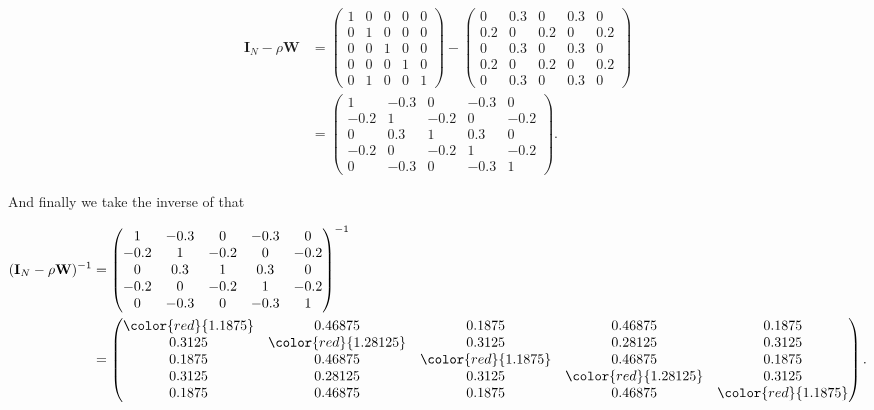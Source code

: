 \documentclass[
  letterpaper,
  DIV=11,
  numbers=noendperiod]{scrreprt}
\begin{document}
\[
\begin{split}
\boldsymbol{\mathbf{I}}_N - \rho \boldsymbol{\mathbf{W}} &=
\begin{pmatrix}
      1 & 0 & 0 & 0 & 0 \\
      0 & 1 & 0 & 0 & 0 \\
      0 & 0 & 1 & 0 & 0 \\
      0 & 0 & 0 & 1 & 0 \\
      0 & 1 & 0 & 0 & 1
      \end{pmatrix} - 
\begin{pmatrix}
      0 & 0.3 & 0 & 0.3 & 0 \\
      0.2 & 0 & 0.2 & 0 & 0.2 \\
      0 & 0.3 & 0 & 0.3 & 0 \\
      0.2 & 0 & 0.2 & 0 & 0.2 \\
      0 & 0.3 & 0 & 0.3 & 0
      \end{pmatrix}\\
& = \begin{pmatrix}
      1 & -0.3 & 0 & -0.3 & 0 \\
      -0.2 & 1 & -0.2 & 0 & -0.2 \\
      0 & 0.3 & 1 & 0.3 & 0 \\
      -0.2 & 0 & -0.2 & 1 & -0.2 \\
      0 & -0.3 & 0 & -0.3 & 1
      \end{pmatrix}.
\end{split}
\]

And finally we take the inverse of that

\[
\begin{split}
(\boldsymbol{\mathbf{I}}_N - \rho \boldsymbol{\mathbf{W}})^{-1} &=
\begin{pmatrix}
      1 & -0.3 & 0 & -0.3 & 0 \\
      -0.2 & 1 & -0.2 & 0 & -0.2 \\
      0 & 0.3 & 1 & 0.3 & 0 \\
      -0.2 & 0 & -0.2 & 1 & -0.2 \\
      0 & -0.3 & 0 & -0.3 & 1
      \end{pmatrix}^{-1}\\
&=
\begin{pmatrix}
      \color{red}{1.1875} & 0.46875 & 0.1875 & 0.46875 & 0.1875 \\
      0.3125 & \color{red}{1.28125} & 0.3125 & 0.28125 & 0.3125 \\
      0.1875 & 0.46875 & \color{red}{1.1875} & 0.46875 & 0.1875 \\
      0.3125 & 0.28125 & 0.3125 & \color{red}{1.28125} & 0.3125 \\
      0.1875 & 0.46875 & 0.1875 & 0.46875 & \color{red}{1.1875}
      \end{pmatrix}.
\end{split}
\]
\end{document}
